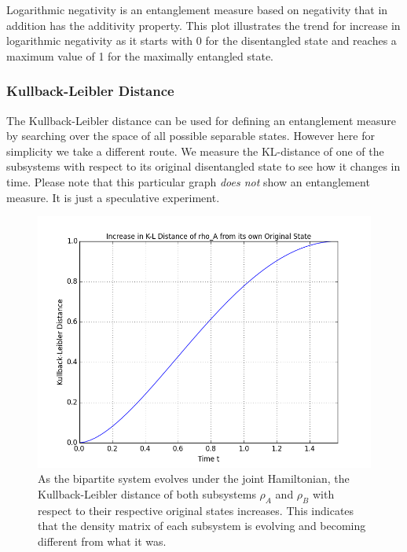 Logarithmic negativity is an entanglement measure based on negativity that in addition has the additivity property. This plot illustrates the trend for increase in logarithmic negativity as it starts with 0 for the disentangled state and reaches a maximum value of 1 for the maximally entangled state.


\pagebreak
\subsubsection{Kullback-Leibler Distance}
The Kullback-Leibler distance can be used for defining an entanglement measure by searching over the space of all possible separable states. However here for simplicity we take a different route. We measure the KL-distance of one of the subsystems with respect to its original disentangled state to see how it changes in time. Please note that this particular graph \textit{does not} show an entanglement measure. It is just a speculative experiment.

\begin{center}
\begin{figure}[H]
  \begin{center}
    \includegraphics[scale=0.62]{figures/timeevolution-06.png}
    \caption{As the bipartite system evolves under the joint Hamiltonian, the Kullback-Leibler distance of both subsystems $\rho_A$ and $\rho_B$ with respect to their respective original states increases. This indicates that the density matrix of each subsystem is evolving and becoming different from what it was.}
    \label{fig: Time Evolution: Kullback-Leibler Distance}
  \end{center}
\end{figure}
\end{center}

